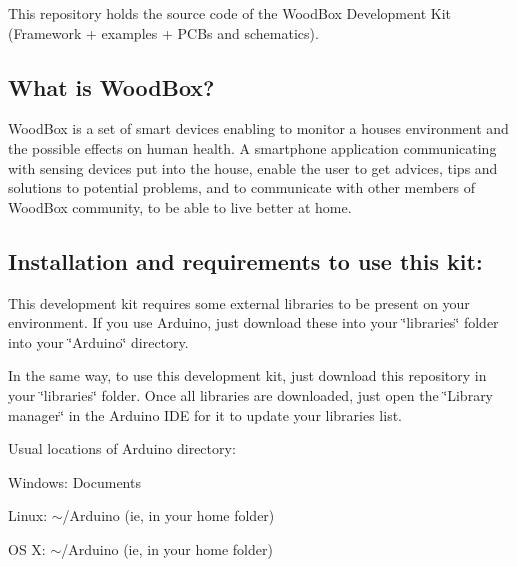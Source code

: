 This repository holds the source code of the Wood\+Box Development Kit (Framework + examples + P\+C\+Bs and schematics).

\subsection*{What is Wood\+Box?}

Wood\+Box is a set of smart devices enabling to monitor a house\textquotesingle{}s environment and the possible effects on human health. A smartphone application communicating with sensing devices put into the house, enable the user to get advices, tips and solutions to potential problems, and to communicate with other members of Wood\+Box community, to be able to live better at home.

\subsection*{Installation and requirements to use this kit\+:}

This development kit requires some external libraries to be present on your environment. If you use Arduino, just download these into your \char`\"{}libraries\char`\"{} folder into your \char`\"{}\+Arduino\char`\"{} directory.

In the same way, to use this development kit, just download this repository in your \char`\"{}libraries\char`\"{} folder. Once all libraries are downloaded, just open the \char`\"{}\+Library manager\char`\"{} in the Arduino I\+DE for it to update your libraries list.

Usual locations of Arduino directory\+:
\begin{DoxyItemize}
\item Windows\+: Documents
\item Linux\+: $\sim$/\+Arduino (ie, in your home folder)
\item OS X\+: $\sim$/\+Arduino (ie, in your home folder)
\end{DoxyItemize}

